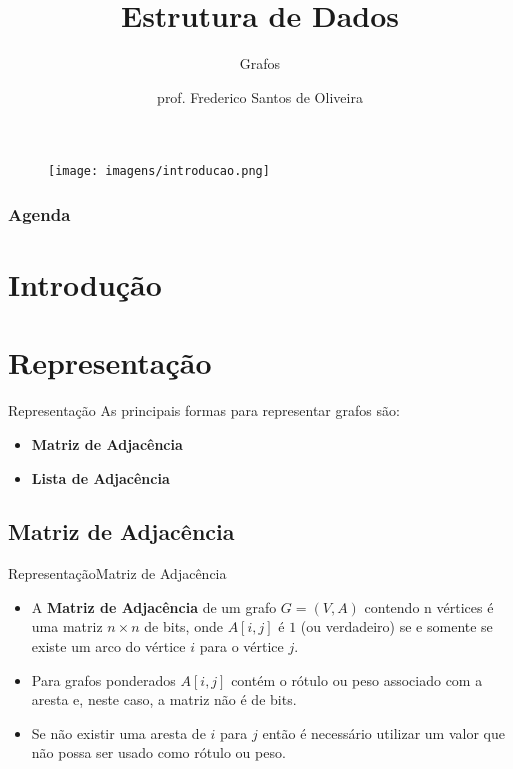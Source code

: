 \documentclass{beamer}
\title[Aula Prática Algoritmos de Ordenação]{Estrutura de Dados}
\subtitle{Grafos}
\author[Frederico Santos de Oliveira]{prof. Frederico Santos de Oliveira}
\institute[UFMT]{Universidade Federal de Mato Grosso\\ Instituto de Engenharia}
\date{}
\begin{document}
\begin{frame}
\titlepage %

\begin{figure}[!h]
  \centering
   \texttt{[image: imagens/introducao.png]}
  \label{fig_introducao}
\end{figure}
\end{frame}


\begin{frame}
  \frametitle{Agenda}
  \tableofcontents
\end{frame}

\section{Introdução}

\section{Representação}

\begin{frame}{Representação}
As principais formas para representar grafos são:
\begin{itemize}
\item {\bf Matriz de Adjacência}
\item {\bf Lista de Adjacência}
\end{itemize}
\end{frame}


\subsection{Matriz de Adjacência}

\begin{frame}{Representação}{Matriz de Adjacência}
\begin{itemize}
\item A {\bf Matriz de Adjacência} de um grafo $G = (V, A)$ contendo n vértices é uma matriz $n \times n$ de bits, onde $A[i, j]$ é $1$ (ou verdadeiro) se e somente se existe um arco do vértice $i$ para o vértice $j$.
\item Para grafos ponderados $A[i, j]$ contém o rótulo ou peso associado com a aresta e, neste caso, a matriz não é de bits.
\item Se não existir uma aresta de $i$ para $j$ então é necessário utilizar um valor que não possa ser usado como rótulo ou peso.
\end{itemize}
\end{frame}
\end{document}

